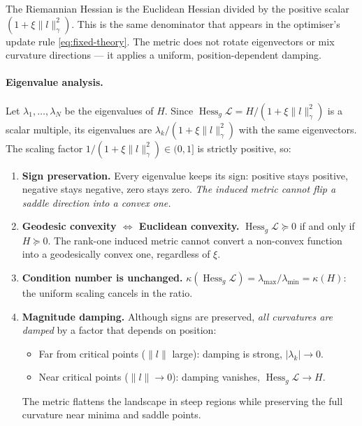 \documentclass{article}
\newcommand{\loss}{\mathcal{L}}
\begin{document}
\begin{tcolorbox}[colback=blue!4, colframe=blue!25, breakable,
  title=\textbf{Interpretation}, coltitle=black]
The Riemannian Hessian is the Euclidean Hessian divided by the
positive scalar $(1+\xi\|l\|_\gamma^2)$.
This is the same denominator that appears in the optimiser's
update rule \eqref{eq:fixed-theory}.
The metric does not rotate eigenvectors or mix curvature directions ---
it applies a uniform, position-dependent damping.
\end{tcolorbox}

\paragraph{Eigenvalue analysis.}
Let $\lambda_1,\ldots,\lambda_N$ be the eigenvalues of $H$.
Since $\operatorname{Hess}_g\loss = H/(1+\xi\|l\|_\gamma^2)$
is a scalar multiple, its eigenvalues are
$\lambda_k/(1+\xi\|l\|_\gamma^2)$ with the same eigenvectors.
The scaling factor $1/(1+\xi\|l\|_\gamma^2) \in (0,1]$ is strictly positive,
so:
\begin{enumerate}[leftmargin=1.8em]
    \item \textbf{Sign preservation.}
    Every eigenvalue keeps its sign:
    positive stays positive, negative stays negative, zero stays zero.
    \emph{The induced metric cannot flip a saddle direction into a convex one.}

    \item \textbf{Geodesic convexity $\Longleftrightarrow$ Euclidean convexity.}
    $\operatorname{Hess}_g\loss\succeq 0$ if and only if $H\succeq 0$.
    The rank-one induced metric cannot convert a non-convex function
    into a geodesically convex one, regardless of $\xi$.

    \item \textbf{Condition number is unchanged.}
    $\kappa(\operatorname{Hess}_g\loss) =
    \lambda_{\max}/\lambda_{\min} = \kappa(H)$:
    the uniform scaling cancels in the ratio.

    \item \textbf{Magnitude damping.}
    Although signs are preserved, \emph{all curvatures are damped}
    by a factor that depends on position:
    \begin{itemize}
        \item Far from critical points ($\|l\|$ large):
              damping is strong, $|\lambda_k| \to 0$.
        \item Near critical points ($\|l\|\to 0$):
              damping vanishes, $\operatorname{Hess}_g\loss \to H$.
    \end{itemize}
    The metric flattens the landscape in steep regions
    while preserving the full curvature near minima and saddle points.
\end{enumerate}
\end{document}
